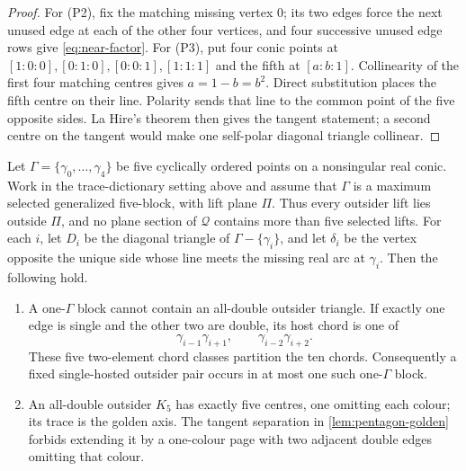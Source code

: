 \begin{proof}
For (P2), fix the matching missing vertex $0$; its two edges force the next
unused edge at each of the other four vertices, and four successive unused
edge rows give \eqref{eq:near-factor}.  For (P3), put four conic points at
$[1:0:0],[0:1:0],[0:0:1],[1:1:1]$ and the fifth at $[a:b:1]$.
Collinearity of the first four matching centres gives
$a=1-b=b^2$.  Direct substitution places the fifth centre on their line.
Polarity sends that line to the common point of the five opposite sides.
La Hire's theorem then gives the tangent statement; a second centre on the
tangent would make one self-polar diagonal triangle collinear.
\end{proof}

\begin{lemma}\label{lem:five-conic-rigidity}
Let $\Gamma=\{\gamma_0,\ldots,\gamma_4\}$ be five cyclically ordered points
on a nonsingular real conic.  Work in the trace-dictionary setting above
and assume that $\Gamma$ is a maximum selected generalized five-block, with
lift plane $\Pi$.  Thus every outsider lift lies outside $\Pi$, and no plane
section of $\mathcal Q$ contains more than five selected lifts.  For each
$i$, let $D_i$ be the diagonal triangle of
$\Gamma-\{\gamma_i\}$, and let $\delta_i$ be the vertex opposite the unique
side whose line meets the missing real arc at $\gamma_i$.
Then the following hold.
\begin{enumerate}
\item[\textup{(K2.1)}] A one-$\Gamma$ block cannot contain an all-double outsider triangle.
If exactly one edge is single and the other two are double, its host chord
is one of
\begin{equation}
 \gamma_{i-1}\gamma_{i+1},\qquad
 \gamma_{i-2}\gamma_{i+2}.\label{eq:cyclic-host}
\end{equation}
These five two-element chord classes partition the ten chords.  Consequently
a fixed single-hosted outsider pair occurs in at most one such
one-$\Gamma$ block.
\item[\textup{(K2.4)}] An all-double outsider $K_5$ has exactly five centres, one omitting
each colour; its trace is the golden axis.  The tangent separation in
\cref{lem:pentagon-golden} forbids extending it by a one-colour page with
two adjacent double edges omitting that colour.
\end{enumerate}
\end{lemma}

